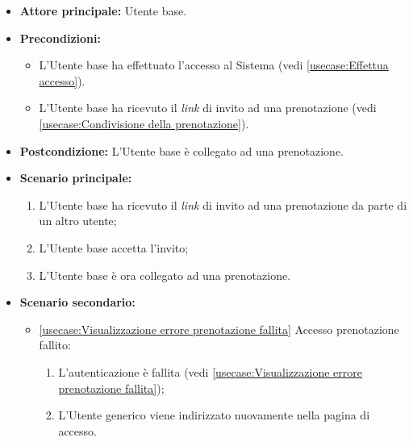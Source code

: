 \label{usecase:Accesso alla prenotazione}
\begin{itemize}
	\item \textbf{Attore principale:} Utente base.

	\item \textbf{Precondizioni:} 
	\begin{itemize}
		\item L'Utente base ha effettuato l'accesso al Sistema (vedi \autoref{usecase:Effettua accesso}).
		\item L'Utente base ha ricevuto il \textit{link} di invito ad una prenotazione (vedi \autoref{usecase:Condivisione della prenotazione}).
	\end{itemize}
		

	\item \textbf{Postcondizione:} L'Utente base è collegato ad una prenotazione.

	\item \textbf{Scenario principale:}
	      \begin{enumerate}
		      \item L'Utente base ha ricevuto il \textit{link} di invito ad una prenotazione da parte di un altro utente;
		      \item L'Utente base accetta l'invito;
		      \item L'Utente base è ora collegato ad una prenotazione.
	      \end{enumerate}

	\item \textbf{Scenario secondario:}
		  \begin{itemize}
			  \item \autoref{usecase:Visualizzazione errore prenotazione fallita} Accesso prenotazione fallito:
			  \begin{enumerate}
				  \item L'autenticazione è fallita (vedi \autoref{usecase:Visualizzazione errore prenotazione fallita});
				  \item L'Utente generico viene indirizzato nuovamente nella pagina di accesso.
			  \end{enumerate}	
		  \end{itemize}
\end{itemize}

